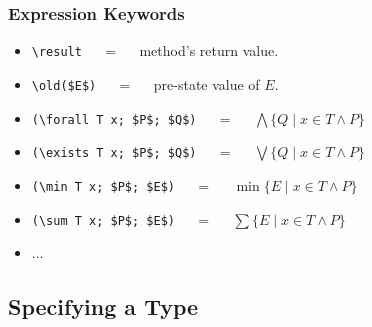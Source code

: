 \begin{frame}[fragile]
\frametitle{Expression Keywords}

\begin{itemize}
\item
\lstinline!\result! ~~ = ~~ method's return value.

\item
\lstinline[mathescape=true]!\old($E$)! ~~ = ~~ pre-state value of $E$.

\item
\lstinline[mathescape=true]!(\forall T x; $P$; $Q$)!
~~ = ~~ $\bigwedge \{ Q \mid x \in T \wedge P \}$

\item
\lstinline[mathescape=true]!(\exists T x; $P$; $Q$)!
~~ = ~~ $\bigvee \{ Q \mid x \in T \wedge P \}$

\item
\lstinline[mathescape=true]!(\min T x; $P$; $E$)!
~~ = ~~ $\min \{E \mid x \in T \wedge P \}$

\item
\lstinline[mathescape=true]!(\sum T x; $P$; $E$)!
~~ = ~~ $\sum \{E \mid x \in T \wedge P \}$
%

\item
$\ldots$
\end{itemize}
\end{frame}

\subsection[Exercise]{Specifying a Type}

